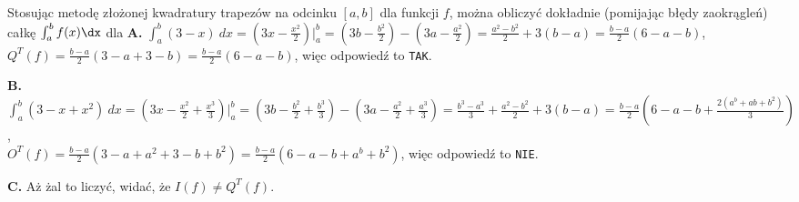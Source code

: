 \begin{solutions}
    \sol Stosując metodę złożonej kwadratury trapezów na odcinku $[a, b]$ dla funkcji $f$, można obliczyć dokładnie (pomijając błędy zaokrągleń) całkę $\int_{a}^{b} f(x) \dx$ dla
    \textbf{A.} $\int_a^b(3-x)\ dx=(3x-\frac{x^2}{2})\big|_a^b=(3b-\frac{b^2}{2})-(3a-\frac{a^2}{2})=\frac{a^2-b^2}{2}+3(b-a)=\frac{b-a}{2}(6-a-b)$, \\
    $Q^T(f)=\frac{b-a}{2}(3-a+3-b)=\frac{b-a}{2}(6-a-b)$, więc odpowiedź to \texttt{TAK}.

    \textbf{B.} $\int_a^b(3-x+x^2)\ dx=(3x-\frac{x^2}{2}+\frac{x^3}{3})\big|_a^b=(3b-\frac{b^2}{2}+\frac{b^3}{3})-(3a-\frac{a^2}{2}+\frac{a^3}{3})=\frac{b^3-a^3}{3}+\frac{a^2-b^2}{2}+3(b-a)=\frac{b-a}{2}(6-a-b+\frac{2(a^b+ab+b^2)}{3})$, \\
    $O^T(f)=\frac{b-a}{2}(3-a+a^2+3-b+b^2)=\frac{b-a}{2}(6-a-b+a^b+b^2)$, więc odpowiedź to \texttt{NIE}.

    \textbf{C.} Aż żal to liczyć, widać, że $I(f)\neq Q^T(f)$.
\end{solutions}

